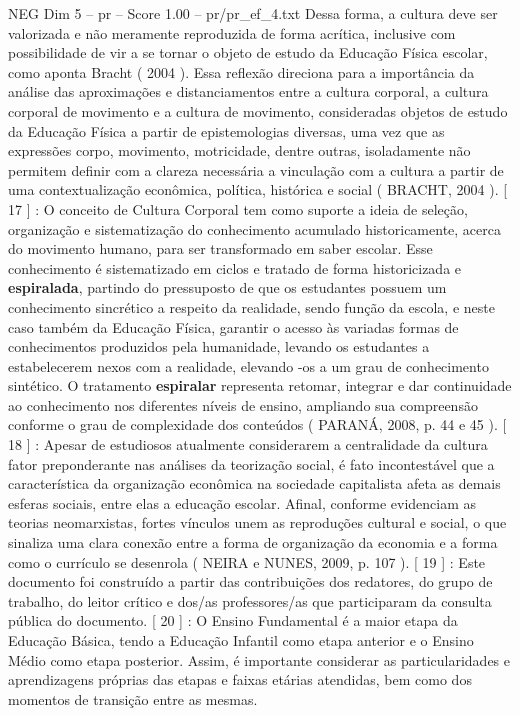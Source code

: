 \begin{textsample}{NEG Dim 5 – pr – Score 1.00 – pr/pr\_ef\_4.txt}
Dessa forma, a cultura deve ser valorizada e não meramente reproduzida de forma acrítica, inclusive com possibilidade de vir a se tornar o objeto de estudo da Educação Física escolar, como aponta Bracht ( 2004 ).
Essa reflexão direciona para a importância da análise das aproximações e distanciamentos entre a cultura corporal, a cultura corporal de movimento e a cultura de movimento, consideradas objetos de estudo da Educação Física a partir de epistemologias diversas, uma vez que as expressões corpo, movimento, motricidade, dentre outras, isoladamente não permitem definir com a clareza necessária a vinculação com a cultura a partir de uma contextualização econômica, política, histórica e social ( BRACHT, 2004 ). [ 17 ] : O conceito de Cultura Corporal tem como suporte a ideia de seleção, organização e sistematização do conhecimento acumulado historicamente, acerca do movimento humano, para ser transformado em saber escolar.
Esse conhecimento é sistematizado em ciclos e tratado de forma historicizada e \textbf{espiralada}, partindo do pressuposto de que os estudantes possuem um conhecimento sincrético a respeito da realidade, sendo função da escola, e neste caso também da Educação Física, garantir o acesso às variadas formas de conhecimentos produzidos pela humanidade, levando os estudantes a estabelecerem nexos com a realidade, elevando -os a um grau de conhecimento sintético.
O tratamento \textbf{espiralar} representa retomar, integrar e dar continuidade ao conhecimento nos diferentes níveis de ensino, ampliando sua compreensão conforme o grau de complexidade dos conteúdos ( PARANÁ, 2008, p. 44 e 45 ). [ 18 ] : Apesar de estudiosos atualmente considerarem a centralidade da cultura fator preponderante nas análises da teorização social, é fato incontestável que a característica da organização econômica na sociedade capitalista afeta as demais esferas sociais, entre elas a educação escolar.
Afinal, conforme evidenciam as teorias neomarxistas, fortes vínculos unem as reproduções cultural e social, o que sinaliza uma clara conexão entre a forma de organização da economia e a forma como o currículo se desenrola ( NEIRA e NUNES, 2009, p. 107 ). [ 19 ] : Este documento foi construído a partir das contribuições dos redatores, do grupo de trabalho, do leitor crítico e dos/as professores/as que participaram da consulta pública do documento. [ 20 ] : O Ensino Fundamental é a maior etapa da Educação Básica, tendo a Educação Infantil como etapa anterior e o Ensino Médio como etapa posterior.
Assim, é importante considerar as particularidades e aprendizagens próprias das etapas e faixas etárias atendidas, bem como dos momentos de transição entre as mesmas.

\end{textsample}
